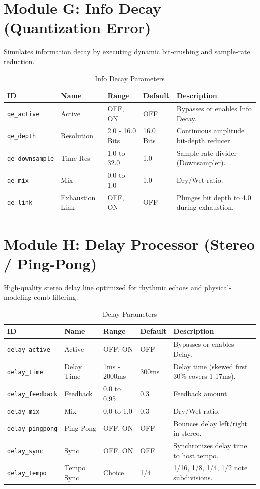 \documentclass[11pt,a4paper,oneside]{book}
\begin{document}
\section{Module G: Info Decay (Quantization Error)}
Simulates information decay by executing dynamic bit-crushing and sample-rate reduction.

\begin{table}[h]
    \centering
    \caption{Info Decay Parameters}
    \begin{tabular}{lllll}
        \toprule
        \textbf{ID} & \textbf{Name} & \textbf{Range} & \textbf{Default} & \textbf{Description} \\
        \midrule
        \texttt{qe\_active} & Active & OFF, ON & OFF & Bypasses or enables Info Decay. \\
        \texttt{qe\_depth} & Resolution & 2.0 - 16.0 Bits & 16.0 Bits & Continuous amplitude bit-depth reducer. \\
        \texttt{qe\_downsample} & Time Res & 1.0 to 32.0 & 1.0 & Sample-rate divider (Downsampler). \\
        \texttt{qe\_mix} & Mix & 0.0 to 1.0 & 1.0 & Dry/Wet ratio. \\
        \texttt{qe\_link} & Exhaustion Link & OFF, ON & OFF & Plunges bit depth to 4.0 during exhaustion. \\
        \bottomrule
    \end{tabular}
\end{table}

\section{Module H: Delay Processor (Stereo / Ping-Pong)}
High-quality stereo delay line optimized for rhythmic echoes and physical-modeling comb filtering.

\begin{table}[h]
    \centering
    \caption{Delay Parameters}
    \begin{tabular}{lllll}
        \toprule
        \textbf{ID} & \textbf{Name} & \textbf{Range} & \textbf{Default} & \textbf{Description} \\
        \midrule
        \texttt{delay\_active} & Active & OFF, ON & OFF & Bypasses or enables Delay. \\
        \texttt{delay\_time} & Delay Time & 1ms - 2000ms & 300ms & Delay time (skewed first 30\% covers 1-17ms). \\
        \texttt{delay\_feedback} & Feedback & 0.0 to 0.95 & 0.3 & Feedback amount. \\
        \texttt{delay\_mix} & Mix & 0.0 to 1.0 & 0.3 & Dry/Wet ratio. \\
        \texttt{delay\_pingpong} & Ping-Pong & OFF, ON & OFF & Bounces delay left/right in stereo. \\
        \texttt{delay\_sync} & Sync & OFF, ON & OFF & Synchronizes delay time to host tempo. \\
        \texttt{delay\_tempo} & Tempo Sync & Choice & 1/4 & 1/16, 1/8, 1/4, 1/2 note subdivisions. \\
        \bottomrule
    \end{tabular}
\end{table}
\end{document}
